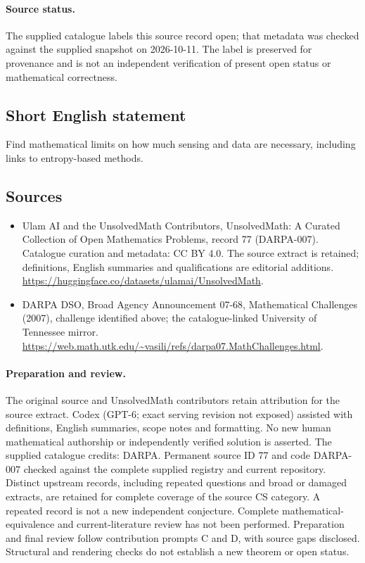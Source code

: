 \documentclass[11pt]{article}
\begin{document}
\paragraph{Source status.}
The supplied catalogue labels this source record open; that metadata was checked against the supplied snapshot on 2026-10-11. The label is preserved for provenance and is not an independent verification of present open status or mathematical correctness.
\subsection{Short English statement}
Find mathematical limits on how much sensing and data are necessary, including links to entropy-based methods.
\subsection{Sources}
\begin{itemize}
\item[\hypertarget{source:77:1}{S1}] Ulam AI and the UnsolvedMath Contributors, UnsolvedMath: A Curated Collection of Open Mathematics Problems, record 77 (DARPA-007). Catalogue curation and metadata: CC BY 4.0. The source extract is retained; definitions, English summaries and qualifications are editorial additions.
\url{https://huggingface.co/datasets/ulamai/UnsolvedMath}.
\item[\hypertarget{source:77:2}{S2}] DARPA DSO, Broad Agency Announcement 07-68, Mathematical Challenges (2007), challenge identified above; the catalogue-linked University of Tennessee mirror.
\url{https://web.math.utk.edu/~vasili/refs/darpa07.MathChallenges.html}.
\end{itemize}
\paragraph{Preparation and review.}
The original source and UnsolvedMath contributors retain attribution for the source extract. Codex (GPT-6; exact serving revision not exposed) assisted with definitions, English summaries, scope notes and formatting. No new human mathematical authorship or independently verified solution is asserted. The supplied catalogue credits: DARPA. Permanent source ID 77 and code DARPA-007 checked against the complete supplied registry and current repository. Distinct upstream records, including repeated questions and broad or damaged extracts, are retained for complete coverage of the source CS category. A repeated record is not a new independent conjecture. Complete mathematical-equivalence and current-literature review has not been performed. Preparation and final review follow contribution prompts C and D, with source gaps disclosed. Structural and rendering checks do not establish a new theorem or open status.
\label{end:77}
\end{document}
